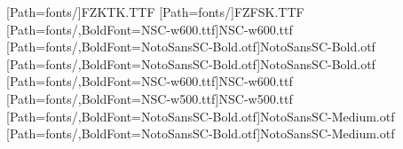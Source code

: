 \setmainfont{Times New Roman}
[Path=fonts/]{FZKTK.TTF}
[Path=fonts/]{FZFSK.TTF}
[Path=fonts/,BoldFont=NSC-w600.ttf]{NSC-w600.ttf}
[Path=fonts/,BoldFont=NotoSansSC-Bold.otf]{NotoSansSC-Bold.otf}
[Path=fonts/,BoldFont=NotoSansSC-Bold.otf]{NotoSansSC-Bold.otf}
[Path=fonts/,BoldFont=NSC-w600.ttf]{NSC-w600.ttf}
[Path=fonts/,BoldFont=NSC-w500.ttf]{NSC-w500.ttf}
[Path=fonts/,BoldFont=NotoSansSC-Bold.otf]{NotoSansSC-Medium.otf}
[Path=fonts/,BoldFont=NotoSansSC-Bold.otf]{NotoSansSC-Medium.otf}

